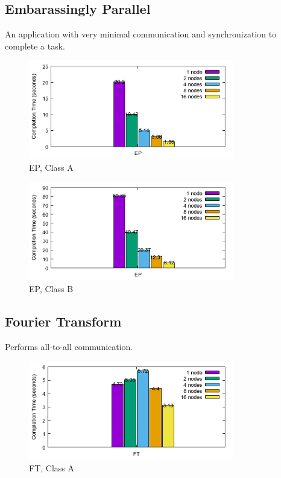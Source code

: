 \documentclass[a4paper]{article}
\begin{document}
\subsection{Embarassingly Parallel}

An application with very minimal communication and synchronization to complete a task.

\begin{figure}[H]
\centering
\includegraphics[width=0.8\textwidth]{figures/EPvA.png}
\caption{\label{fig:EPvA}EP, Class A}
\end{figure}

\begin{figure}[H]
\centering
\includegraphics[width=0.8\textwidth]{figures/EPvB.png}
\caption{\label{fig:EPvB}EP, Class B}
\end{figure}


\subsection{Fourier Transform}
Performs all-to-all communication.


\begin{figure}[H]
\centering
\includegraphics[width=0.8\textwidth]{figures/FTvA.png}
\caption{\label{fig:FTvA}FT, Class A}
\end{figure}
\end{document}
